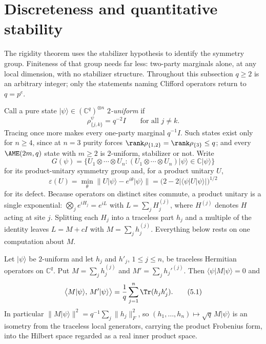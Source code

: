 \section{Discreteness and quantitative stability}
\label{sec:two-uniform}

The rigidity theorem uses the stabilizer hypothesis to identify the
symmetry group.  Finiteness of that group needs far less: two-party
marginals alone, at any local dimension, with no stabilizer structure.
Throughout this subsection \(q\geq2\) is an arbitrary integer; only the
statements naming Clifford operators return to \(q=p^e\).

Call a pure state
\(\lvert\psi\rangle\in(\mathbb C^q)^{\otimes n}\) \emph{\(2\)-uniform} if
\[
 \rho^\psi_{\{j,k\}}=q^{-2}I\qquad\text{for all }j\ne k .
\]
Tracing once more makes every one-party marginal \(q^{-1}I\).  Such states
exist only for \(n\geq4\), since at \(n=3\) purity forces
\(\rank\rho_{\{1,2\}}=\rank\rho_{\{3\}}\leq q\); and every
\(\AME(2m,q)\) state with \(m\geq2\) is \(2\)-uniform, stabilizer or not.
Write
\[
 G(\psi)=\{U_1\otimes\cdots\otimes U_n:
   (U_1\otimes\cdots\otimes U_n)\lvert\psi\rangle
     \in\mathbb C\lvert\psi\rangle\}
\]
for its product-unitary symmetry group and, for a product unitary \(U\),
\[
 \varepsilon(U)=\min_\theta\bigl\lVert U\lvert\psi\rangle
    -e^{i\theta}\lvert\psi\rangle\bigr\rVert
  =\bigl(2-2\lvert\langle\psi\rvert U\lvert\psi\rangle\rvert
   \bigr)^{1/2}
\]
for its defect.  Because operators on distinct sites commute, a product
unitary is a single exponential:
\(\bigotimes_je^{iH_j}=e^{iL}\) with \(L=\sum_jH_j^{(j)}\), where
\(H^{(j)}\) denotes \(H\) acting at site \(j\).  Splitting each \(H_j\)
into a traceless part \(h_j\) and a multiple of the identity leaves
\(L=M+cI\) with \(M=\sum_jh_j^{(j)}\).  Everything below rests on one
computation about \(M\).

\AMEFigureFour

\begin{lemma}
\label{lem:local-generator-isometry}
Let \(\lvert\psi\rangle\) be \(2\)-uniform and let \(h_j\) and \(h'_j\),
\(1\leq j\leq n\), be traceless Hermitian operators on \(\mathbb C^q\).
Put \(M=\sum_jh_j^{(j)}\) and \(M'=\sum_jh_j'^{(j)}\).  Then
\(\langle\psi\rvert M\lvert\psi\rangle=0\) and
\[
 \bigl\langle M\lvert\psi\rangle,\,M'\lvert\psi\rangle\bigr\rangle
  =\frac1q\sum_{j=1}^n\Tr(h_jh'_j).                      \tag{5.1}
\]
In particular \(\lVert M\lvert\psi\rangle\rVert^2
 =q^{-1}\sum_j\lVert h_j\rVert_F^2\), so
\((h_1,\ldots,h_n)\mapsto\sqrt q\,M\lvert\psi\rangle\) is an isometry from
the traceless local generators, carrying the product Frobenius form, into
the Hilbert space regarded as a real inner product space.
\end{lemma}

